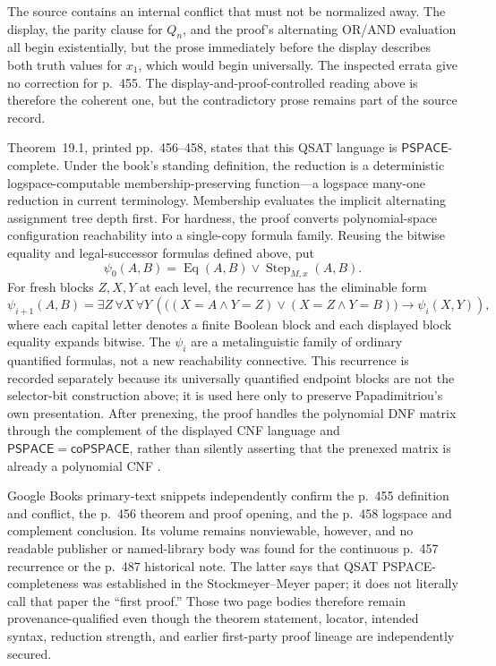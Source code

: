 The source contains an internal conflict that must not be normalized away.
The display, the parity clause for \(Q_n\), and the proof's alternating
OR/AND evaluation all begin existentially, but the prose immediately before
the display describes both truth values for \(x_1\), which would begin
universally.  The inspected errata give no correction for p.~455.  The
display-and-proof-controlled reading above is therefore the coherent one, but
the contradictory prose remains part of the source record.

Theorem~19.1, printed pp.~456--458, states that this QSAT language is
\(\mathsf{PSPACE}\)-complete.  Under the book's standing definition, the
reduction is a deterministic logspace-computable membership-preserving
function---a logspace many-one reduction in current terminology.  Membership
evaluates the implicit alternating assignment tree depth first.  For hardness,
the proof converts polynomial-space configuration reachability into a
single-copy formula family.  Reusing the bitwise equality and legal-successor
formulas defined above, put
\[
 \psi_0(A,B)=\operatorname{Eq}(A,B)\lor
              \operatorname{Step}_{M,x}(A,B).
\]
For fresh blocks \(Z,X,Y\) at each level, the recurrence has the eliminable
form
\[
 \psi_{i+1}(A,B)=
 \exists Z\,\forall X\,\forall Y\,
 \left(
   \bigl((X=A\land Y=Z)\lor(X=Z\land Y=B)\bigr)
   \to \psi_i(X,Y)
 \right),
\]
where each capital letter denotes a finite Boolean block and each displayed
block equality expands bitwise.  The \(\psi_i\) are a metalinguistic family of
ordinary quantified formulas, not a new reachability connective.  This
recurrence is recorded separately because its universally quantified endpoint
blocks are not the selector-bit construction above; it is used here only to
preserve Papadimitriou's own presentation.  After prenexing, the proof handles
the polynomial DNF matrix through the complement of the displayed CNF language
and \(\mathsf{PSPACE}=\mathsf{coPSPACE}\), rather than silently asserting that
the prenexed matrix is already a polynomial CNF
\cite[pp.~455--458]{Papadimitriou1994}.

Google Books primary-text snippets independently confirm the p.~455 definition
and conflict, the p.~456 theorem and proof opening, and the p.~458 logspace and
complement conclusion.  Its volume remains nonviewable, however, and no
readable publisher or named-library body was found for the continuous p.~457
recurrence or the p.~487 historical note.  The latter says that QSAT
PSPACE-completeness was established in the Stockmeyer--Meyer paper; it does not
literally call that paper the ``first proof.''  Those two page bodies therefore
remain provenance-qualified even though the theorem statement, locator,
intended syntax, reduction strength, and earlier first-party proof lineage are
independently secured.


